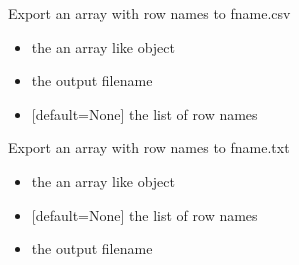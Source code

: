 \documentclass[letterpaper,10pt,english]{sphinxmanual}
\begin{document}

\begin{fulllineitems}
\label{\detokenize{modules_doc:cbmpy.CBTools.exportLabelledArray2CSV}}
\pysigstartsignatures
{}
\pysigstopsignatures
\sphinxAtStartPar
Export an array with row names to fname.csv
\begin{itemize}
\item {} 
\sphinxAtStartPar
{} the an array like object

\item {} 
\sphinxAtStartPar
{} the output filename

\item {} 
\sphinxAtStartPar
{} {[}default=None{]} the list of row names

\end{itemize}

\end{fulllineitems}


\begin{fulllineitems}
\label{\detokenize{modules_doc:cbmpy.CBTools.exportLabelledArray2TXT}}
\pysigstartsignatures
{}
\pysigstopsignatures
\sphinxAtStartPar
Export an array with row names to fname.txt
\begin{itemize}
\item {} 
\sphinxAtStartPar
{} the an array like object

\item {} 
\sphinxAtStartPar
{} {[}default=None{]} the list of row names

\item {} 
\sphinxAtStartPar
{} the output filename

\end{itemize}

\end{fulllineitems}
\end{document}
